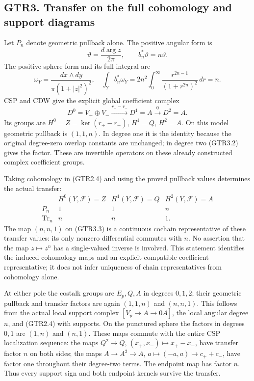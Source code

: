 \subsection{GTR3. Transfer on the full cohomology and support
diagrams}\label{gtr3.-transfer-on-the-full-cohomology-and-support-diagrams}

Let \(P_n\) denote geometric pullback alone. The positive angular form
is \[
\vartheta=\frac{d\arg z}{2\pi},\qquad b_n^*\vartheta=n\vartheta.
\tag{GTR3.1}
\] The positive sphere form and its full integral are \[
\omega_Y=\frac{dx\wedge dy}{\pi(1+|z|^2)^2},\quad
\int_Yb_n^*\omega_Y
=2n^2\int_0^\infty\frac{r^{2n-1}}{(1+r^{2n})^2}\,dr=n.
\tag{GTR3.2}
\] CSP and CDW give the explicit global coefficient complex \[
D^0=V_+\oplus V_-\xrightarrow{r_+-r_-}D^1=A\xrightarrow0D^2=A.
\tag{GTR3.3}
\] Its groups are \(H^0=Z=\ker(r_+-r_-)\), \(H^1=Q\), \(H^2=A\). On this
model geometric pullback is \((1,1,n)\). In degree one it is the
identity because the original degree-zero overlap constants are
unchanged; in degree two (GTR3.2) gives the factor. These are invertible
operators on these already constructed complex coefficient groups.

Taking cohomology in (GTR2.4) and using the proved pullback values
determines the actual transfer: \[
\begin{array}{c|ccc}
&H^0(Y,\mathscr F)=Z&H^1(Y,\mathscr F)=Q&H^2(Y,\mathscr F)=A\\\hline
P_n&1&1&n\\
\operatorname{Tr}_n&n&n&1.
\end{array}
\tag{GTR3.4}
\] The map \((n,n,1)\) on (GTR3.3) is a continuous cochain
representative of these transfer values: its only nonzero differential
commutes with \(n\). No assertion that the map \(z\mapsto z^n\) has a
single-valued inverse is involved. This statement identifies the induced
cohomology maps and an explicit compatible coefficient representative;
it does not infer uniqueness of chain representatives from cohomology
alone.

At either pole the costalk groups are \(E_p,Q,A\) in degrees \(0,1,2\);
their geometric pullback and transfer factors are again \((1,1,n)\) and
\((n,n,1)\). This follows from the actual local support complex
\([V_p\to A\to0 A]\), the local angular degree \(n\), and (GTR2.4) with
supports. On the punctured sphere the factors in degrees \(0,1\) are
\((1,n)\) and \((n,1)\). These maps commute with the entire CSP
localization sequence: the maps \(Q^2\to Q\),
\((x_+,x_-)\mapsto x_+-x_-\), have transfer factor \(n\) on both sides;
the maps \(A\to A^2\to A\), \(a\mapsto(-a,a)\mapsto c_++c_-\), have
factor one throughout their degree-two terms. The endpoint map has
factor \(n\). Thus every support sign and both endpoint kernels survive
the transfer.


